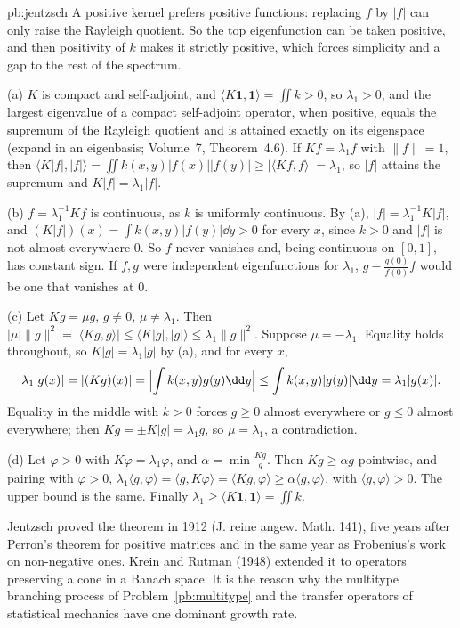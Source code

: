 \begin{solution}{pb:jentzsch}
\idea A positive kernel prefers positive functions: replacing $f$ by $|f|$ can only raise the Rayleigh quotient. So the top eigenfunction can be taken positive, and then positivity of $k$ makes it
strictly positive, which forces simplicity and a gap to the rest of the spectrum.

\writeup (a) $K$ is compact and self-adjoint, and $\langle K\mathbf 1,\mathbf 1\rangle=\iint k>0$, so $\lambda_1>0$, and the largest eigenvalue of a compact self-adjoint operator, when positive, equals the
supremum of the Rayleigh quotient and is attained exactly on its eigenspace (expand in an eigenbasis; Volume~7, Theorem~4.6). If $Kf=\lambda_1f$ with $\|f\|=1$, then
$\langle K|f|,|f|\rangle=\iint k(x,y)|f(x)||f(y)|\ge|\langle Kf,f\rangle|=\lambda_1$, so $|f|$ attains the supremum and $K|f|=\lambda_1|f|$.

(b) $f=\lambda_1^{-1}Kf$ is continuous, as $k$ is uniformly continuous. By (a), $|f|=\lambda_1^{-1}K|f|$, and $(K|f|)(x)=\int k(x,y)|f(y)|\dd y>0$ for every $x$, since $k>0$ and $|f|$ is not almost
everywhere $0$. So $f$ never vanishes and, being continuous on $[0,1]$, has constant sign. If $f,g$ were independent eigenfunctions for $\lambda_1$, $g-\frac{g(0)}{f(0)}f$ would be one that vanishes at $0$.

(c) Let $Kg=\mu g$, $g\ne0$, $\mu\ne\lambda_1$. Then $|\mu|\|g\|^2=|\langle Kg,g\rangle|\le\langle K|g|,|g|\rangle\le\lambda_1\|g\|^2$. Suppose $\mu=-\lambda_1$. Equality holds throughout, so
$K|g|=\lambda_1|g|$ by (a), and for every $x$,
\[
\lambda_1|g(x)|=|(Kg)(x)|=\Bigl|\int k(x,y)g(y)\dd y\Bigr|\le\int k(x,y)|g(y)|\dd y=\lambda_1|g(x)|.
\]
Equality in the middle with $k>0$ forces $g\ge0$ almost everywhere or $g\le0$ almost everywhere; then $Kg=\pm K|g|=\lambda_1g$, so $\mu=\lambda_1$, a contradiction.

(d) Let $\varphi>0$ with $K\varphi=\lambda_1\varphi$, and $\alpha=\min\frac{Kg}g$. Then $Kg\ge\alpha g$ pointwise, and pairing with $\varphi>0$, $\lambda_1\langle g,\varphi\rangle=\langle g,K\varphi\rangle=\langle Kg,\varphi\rangle\ge\alpha\langle g,\varphi\rangle$,
with $\langle g,\varphi\rangle>0$. The upper bound is the same. Finally $\lambda_1\ge\langle K\mathbf 1,\mathbf 1\rangle=\iint k$.

\leads Jentzsch proved the theorem in 1912 (J. reine angew. Math. 141), five years after Perron's theorem for positive matrices and in the same year as Frobenius's work on non-negative ones.
Krein and Rutman (1948) extended it to operators preserving a cone in a Banach space. It is the reason why the multitype branching process of Problem~\ref{pb:multitype} and the transfer operators
of statistical mechanics have one dominant growth rate.
\end{solution}

